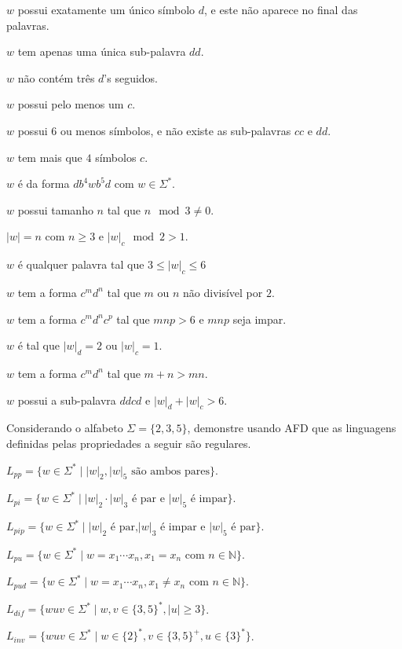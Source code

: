 \begin{exerList}
	\item $w$ possui exatamente um único símbolo $d$, e este não aparece no final das palavras.
	\item $w$ tem apenas uma única sub-palavra $dd$.
	\item $w$ não contém três $d$'s seguidos.
	\item $w$ possui pelo menos um $c$.
	\item $w$ possui 6 ou menos símbolos, e não existe as sub-palavras $cc$ e $dd$.
	\item $w$ tem mais que $4$ símbolos $c$.
	\item $w$ é da forma $db^4wb^5d$ com $w \in \Sigma^*$.
	\item $w$ possui tamanho $n$ tal que $n \mod 3 \neq 0$.
	\item $|w| = n$ com $n \geq 3$ e $|w|_c \mod 2 > 1$.
	\item $w$ é qualquer palavra tal que $3 \leq |w|_c \leq 6$
	\item $w$ tem a forma $c^md^n$ tal que $m$ ou $n$ não divisível por $2$.
	\item $w$ tem a forma $c^md^nc^p$ tal que $mnp > 6$ e $mnp$ seja impar.
	\item $w$ é tal que $|w|_d = 2$ ou $|w|_c = 1$.
	\item $w$ tem a forma $c^md^n$ tal que $m+n > mn$.
	\item $w$ possui a sub-palavra  $ddcd$ e $|w|_d + |w|_c > 6$.
\end{exerList}

\begin{problem}\label{prob:Regulares4}
	Considerando o alfabeto $\Sigma = \{2, 3, 5\}$, demonstre usando AFD que as linguagens definidas pelas propriedades a seguir são regulares.
\end{problem}

\begin{exerList}
	\item $L_{pp} = \{w \in \Sigma^* \mid |w|_2, |w|_5 \text{ são ambos pares}\}$.
	\item $L_{pi} = \{w \in \Sigma^* \mid |w|_2 \cdot |w|_3 \text{ é par e } |w|_5 \text{ é impar}\}$.
	\item $L_{pip} = \{w \in \Sigma^* \mid |w|_2 \text{ é par,} |w|_3 \text{ é impar e } |w|_5 \text{ é par}\}$.
	\item $L_{pu} = \{w \in \Sigma^* \mid w = x_1\cdots x_n, x_1 = x_n \text{ com } n \in \mathbb{N}\}$.
	\item $L_{pud} = \{w \in \Sigma^* \mid w = x_1\cdots x_n, x_1 \neq x_n \text{ com } n \in \mathbb{N}\}$.
	\item $L_{dif} = \{wuv \in \Sigma^* \mid w,v \in \{3,5\}^*, |u| \geq 3\}$.
	\item $L_{inv} = \{wuv \in \Sigma^* \mid w \in \{2\}^*,v \in \{3,5\}^+, u \in \{3\}^*\}$.
\end{exerList}

